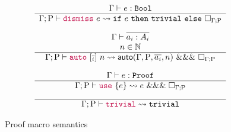 \begin{figure*}
{\[\begin{array}{c}
\\[1em]
  \Gamma \vdash e:\mathtt{Bool} \\
  \hline
  \Gamma; \mathrm{P}
  \vdash
  {\color{purple}\ensuremath{\mathtt{dismiss}}} ~ e
  \rightsquigarrow
  \mathtt{if} ~ e ~ \mathtt{then} ~ \mathtt{trivial} ~ \mathtt{else} ~ \Box_{\Gamma ; \mathrm{P}}
\\[1em]
  \Gamma \vdash \overline{a_i:A_i} \\
  n \in \mathbb{N} \\
  \hline 
  \Gamma; \mathrm{P}
  \vdash 
  {\color{purple}\ensuremath{\mathtt{auto}}} ~ [\overline{_i}] ~ n
  \rightsquigarrow
  \mathsf{auto}(\Gamma, \mathrm{P}, \overline{a_i}, n) ~ \mathtt{\&\&\&} ~ \Box_{\Gamma ; \mathrm{P}}
\\[1em]
  \Gamma \vdash e : \mathtt{Proof} \\
  \hline
  \Gamma; \mathrm{P}
  \vdash 
  {\color{purple}\ensuremath{\mathtt{use}}} ~ \{ e \} 
  \rightsquigarrow
  e ~ \mathtt{\&\&\&} ~ \Box_{\Gamma ; \mathrm{P}}
\\[1em]
  \hline
  \Gamma; \mathrm{P}
  \vdash
  {\color{purple}\ensuremath{\mathtt{trivial}}}
  \rightsquigarrow
  \mathtt{trivial}
\end{array}
\]
}
\caption{Proof macro semantics}
\label{fig:proof-macro-semantics}
\end{figure*}


